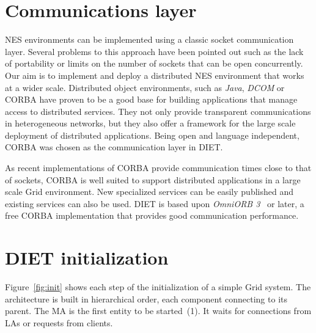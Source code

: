
\section{Communications layer}
\label{sec:CORBA}

NES environments can be implemented using a classic socket
communication layer.  Several problems to this approach have been
pointed out such as the lack of portability or limits on the
number of sockets that can be open concurrently.
Our aim is to implement and deploy a distributed NES
environment that works at a wider scale. Distributed object
environments, such as \emph{Java}, \emph{DCOM} or CORBA have proven to
be a good base for building applications that manage access to
distributed services. They not only provide transparent communications
in heterogeneous networks, but they also offer a framework for the
large scale deployment of distributed applications. Being open and
language independent, CORBA was chosen as the communication layer in
DIET.

As recent implementations of CORBA provide communication times close to
that of sockets, CORBA is well suited to support distributed
applications in a large scale Grid environment. New specialized
services can be easily published and existing services can also be
used.  DIET is based upon \emph{OmniORB 3}~\cite{OMNIORB} or later,
a free CORBA implementation that provides good communication
performance.



\section{DIET initialization}
\label{init}

Figure~\ref{fig:init} shows each step of the initialization of a
simple Grid system. The architecture is built in hierarchical order,
each component connecting to its parent. The MA is the first entity to
be started~(1). It waits for connections from LAs or requests from
clients.

